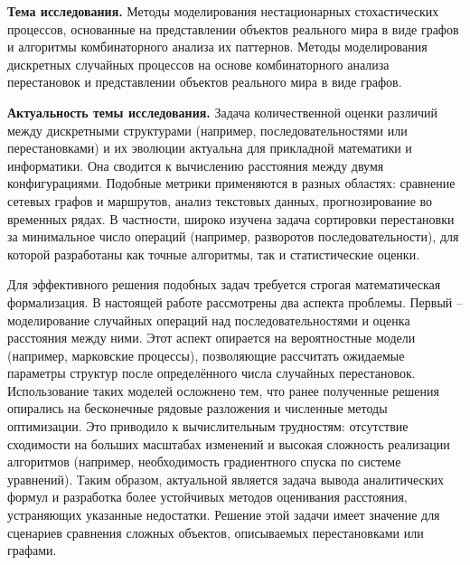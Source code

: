 

\textbf{Тема исследования.}
Методы моделирования нестационарных стохастических процессов, основанные на представлении объектов реального мира в виде графов и алгоритмы комбинаторного анализа их паттернов. 
Методы моделирования дискретных случайных процессов на основе комбинаторного анализа перестановок и представлении объектов реального мира в виде графов.

\textbf{Актуальность темы исследования.}
Задача количественной оценки различий между дискретными структурами (например, последовательностями или перестановками) и их эволюции актуальна для прикладной математики и информатики. Она сводится к вычислению расстояния между двумя конфигурациями. Подобные метрики применяются в разных областях: сравнение сетевых графов и маршрутов, анализ текстовых данных, прогнозирование во временных рядах. В частности, широко изучена задача сортировки перестановки за минимальное число операций (например, разворотов последовательности), для которой разработаны как точные алгоритмы, так и статистические оценки.

Для эффективного решения подобных задач требуется строгая математическая формализация. В настоящей работе рассмотрены два аспекта проблемы. Первый – моделирование случайных операций над последовательностями и оценка расстояния между ними. Этот аспект опирается на вероятностные модели (например, марковские процессы), позволяющие рассчитать ожидаемые параметры структур после определённого числа случайных перестановок. Использование таких моделей осложнено тем, что ранее полученные решения опирались на бесконечные рядовые разложения и численные методы оптимизации. Это приводило к вычислительным трудностям: отсутствие сходимости на больших масштабах изменений и высокая сложность реализации алгоритмов (например, необходимость градиентного спуска по системе уравнений). Таким образом, актуальной является задача вывода аналитических формул и разработка более устойчивых методов оценивания расстояния, устраняющих указанные недостатки. Решение этой задачи имеет значение для сценариев сравнения сложных объектов, описываемых перестановками или графами.

